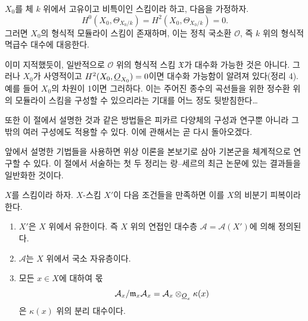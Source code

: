  $X_0$를 체 $k$ 위에서 고유이고 비특이인 스킴이라 하고,
다음을 가정하자.
\[
  H^0(X_0,\Theta_{X_0/k})=H^2(X_0,\Theta_{X_0/k})=0.
\]
그러면 $X_0$의 형식적 모듈라이 스킴이 존재하며, 이는 정칙 국소환
$\mathcal O$, 즉 $k$ 위의 형식적 멱급수 대수에 대응한다.

이미 지적했듯이, 일반적으로 $\mathcal O$ 위의 형식적 스킴 $\mathfrak X$가
대수화 가능한 것은 아니다. 그러나 $X_0$가 사영적이고
$H^2(X_0,\underline{O}_{X_0})=0$이면 대수화 가능함이 알려져 있다(정리 4). 예를
들어 $X_0$의 차원이 1이면 그러하다. 이는 주어진 종수의 곡선들을 위한
정수환 위의 모듈라이 스킴을 구성할 수 있으리라는 기대를 어느 정도
뒷받침한다\ldots{}

또한 이 절에서 설명한 것과 같은 방법들은 피카르 다양체의 구성과 연구뿐
아니라 그 밖의 여러 구성에도 적용할 수 있다. 이에 관해서는 곧 다시
돌아오겠다.

앞에서 설명한 기법들을 사용하면 위상 이론을 본보기로 삼아 기본군을
체계적으로 연구할 수 있다. 이 절에서 서술하는 첫 두 정리는 랑--세르의
최근 논문에 있는 결과들을 일반화한 것이다.

$X$를 스킴이라 하자. $X$-스킴 $X'$이 다음 조건들을 만족하면 이를
$X$의 비분기 피복이라 한다.
\begin{enumerate}
  \item[\textit{i.}] $X'$은 $X$ 위에서 유한이다. 즉 $X$ 위의 연접인
    대수층 $\mathcal A=\mathcal A(X')$에 의해 정의된다.
  \item[\textit{ii.}] $\mathcal A$는 $X$ 위에서 국소 자유층이다.
  \item[\textit{iii.}] 모든 $x\in X$에 대하여 몫
    \[
      \mathcal A_x/\mathfrak m_x\mathcal A_x
      =\mathcal A_x\otimes_{\underline{O}_x}\kappa(x)
    \]
    은 $\kappa(x)$ 위의 분리 대수이다.
\end{enumerate}

